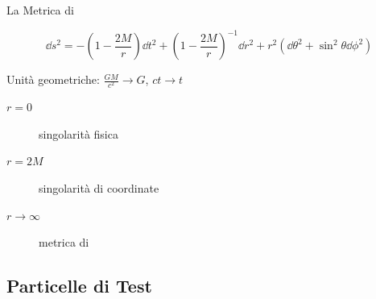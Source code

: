 \begin{frame}[t]{La Metrica di \Sh}

    \begin{equation*}
        \dd s^2 = - \left( 1 - \frac{2M}{r} \right) \dd t^2
        + \left( 1 - \frac{2M}{r} \right)^{-1} \dd r^2
        + r^2 (\dd \theta^2 + \sin^2 \theta \dd \phi^2)
    \end{equation*}
    

    \vspace{0.5cm}

    Unità geometriche: $\frac{GM}{c^2} \to G$, $ct \to t$

    \vspace{0.5cm}

    \begin{description}
        \item[$r = 0$] singolarità fisica \\
        \item[$r = 2M$] singolarità di coordinate \\
        \item[$r \to \infty$] metrica di \Mi \\
    \end{description}

\end{frame}


\subsection{Particelle di Test}

